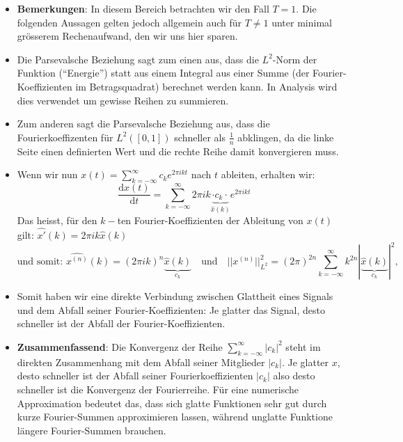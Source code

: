 \documentclass[11pt]{article}
\begin{document}
    \begin{itemize}[leftmargin=0pt]
        \item[] \textbf{Bemerkungen}: In diesem Bereich betrachten wir den Fall $T=1$. Die folgenden Aussagen gelten jedoch allgemein auch für $T\neq 1$ unter minimal grösserem Rechenaufwand, den wir uns hier sparen.
        \item[] Die Parsevalsche Beziehung sagt zum einen aus, dass die $L^2$-Norm der Funktion (“Energie”) statt aus einem Integral aus einer Summe (der Fourier-Koeffizienten im Betragsquadrat) berechnet werden kann. In Analysis wird dies verwendet um gewisse Reihen zu summieren.
        \item[] Zum anderen sagt die Parsevalsche Beziehung aus, dass die Fourierkoeffizenten für $L^2([0,1])$ schneller als $\frac{1}{n}$ abklingen, da die linke Seite einen definierten Wert und die rechte Reihe damit konvergieren muss.
        \item[] Wenn wir nun $x(t) = \sum_{k = -\infty}^\infty c_k e^{2 \pi i k t}$ nach $t$ ableiten, erhalten wir:
        $$\frac{\text{d}x(t)}{\text{d}t} = \sum_{k=-\infty}^{\infty} 2 \pi i k \underbrace{\cdot c_k \cdot}_{\hat{x}(k)} e^{2 \pi i k t}$$
        Das heisst, für den $k-$ten Fourier-Koeffizienten der Ableitung von $x(t)$ gilt: $\hat{x'}(k) = 2 \pi i k \hat{x}(k)$ 
        $$\text{und somit: }\widehat{x^{(n)}}(k) = (2 \pi i k)^n \underbrace{\hat{x}(k)}_{c_k} \hspace{12pt} \text{und} \hspace{12pt} ||x^{(n)}||^2_{L^2} = (2 \pi)^{2n} \sum_{k = -\infty}^\infty k^{2n}|\underbrace{\hat{x}(k)}_{c_k}|^2,$$
        \item[] Somit haben wir eine direkte Verbindung zwischen Glattheit eines Signals und dem Abfall seiner Fourier-Koeffizienten: Je glatter das Signal, desto schneller ist der Abfall der Fourier-Koeffizienten.
        \item[] \textbf{Zusammenfassend}: Die Konvergenz der Reihe $\sum_{k=-\infty}^\infty |c_k|^2$ steht im direkten Zusammenhang mit dem Abfall seiner Mitglieder $|c_k|$. Je glatter $x$, desto schneller ist der Abfall seiner Fourierkoeffizienten $|c_k|$ also desto schneller ist die Konvergenz der Fourierreihe. Für eine numerische Approximation bedeutet das, dass sich glatte Funktionen sehr gut durch kurze Fourier-Summen approximieren lassen, während unglatte Funktione längere Fourier-Summen brauchen.
    \end{itemize}

\pagebreak
\end{document}
